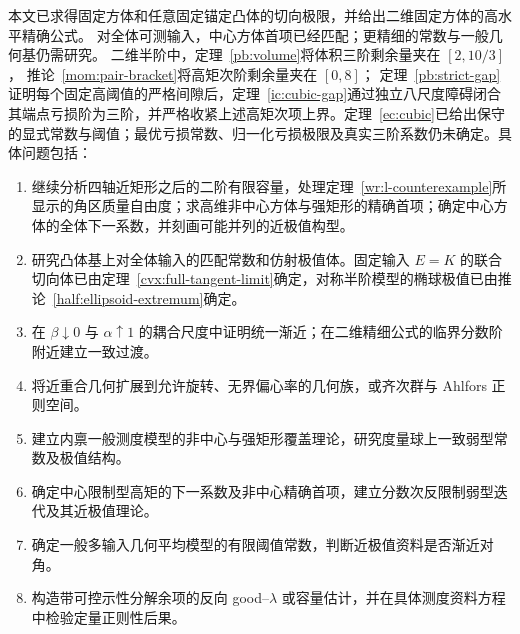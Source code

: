 本文已求得固定方体和任意固定锚定凸体的切向极限，并给出二维固定方体的高水平精确公式。
对全体可测输入，中心方体首项已经匹配；更精细的常数与一般几何基仍需研究。
二维半阶中，定理~\ref{pb:volume}将体积三阶剩余量夹在 $[2,10/3]$，
推论~\ref{mom:pair-bracket}将高矩次阶剩余量夹在 $[0,8]$；
定理~\ref{pb:strict-gap}证明每个固定高阈值的严格间隙后，定理~\ref{ic:cubic-gap}通过独立八尺度障碍闭合其端点亏损阶为三阶，并严格收紧上述高矩次项上界。定理~\ref{ec:cubic}已给出保守的显式常数与阈值；最优亏损常数、归一化亏损极限及真实三阶系数仍未确定。具体问题包括：
\begin{enumerate}
\item 继续分析四轴近矩形之后的二阶有限容量，处理定理~\ref{wr:l-counterexample}所显示的角区质量自由度；求高维非中心方体与强矩形的精确首项；确定中心方体的全体下一系数，并刻画可能并列的近极值构型。
\item 研究凸体基上对全体输入的匹配常数和仿射极值体。固定输入 $E=K$ 的联合切向体已由定理~\ref{cvx:full-tangent-limit}确定，对称半阶模型的椭球极值已由推论~\ref{half:ellipsoid-extremum}确定。
\item 在 $\beta\downarrow0$ 与 $\alpha\uparrow1$ 的耦合尺度中证明统一渐近；在二维精细公式的临界分数阶附近建立一致过渡。
\item 将近重合几何扩展到允许旋转、无界偏心率的几何族，或齐次群与 Ahlfors 正则空间。
\item 建立内禀一般测度模型的非中心与强矩形覆盖理论，研究度量球上一致弱型常数及极值结构。
\item 确定中心限制型高矩的下一系数及非中心精确首项，建立分数次反限制弱型迭代及其近极值理论。
\item 确定一般多输入几何平均模型的有限阈值常数，判断近极值资料是否渐近对角。
\item 构造带可控示性分解余项的反向 good--$\lambda$ 或容量估计，并在具体测度资料方程中检验定量正则性后果。
\end{enumerate}
